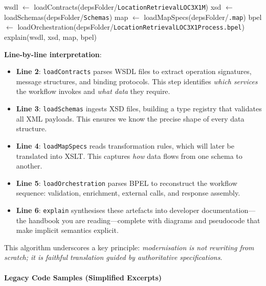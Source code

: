 \documentclass[11pt]{article}
\begin{document}
\begin{algorithm}
\caption{Understand Legacy Assets}
\label{alg:legacy-understanding}
\begin{algorithmic}[1]
  \State wsdl $\gets$ loadContracts(depsFolder/\texttt{LocationRetrievalLOC3X1M})
  \State xsd  $\gets$ loadSchemas(depsFolder/\texttt{Schemas})
  \State map  $\gets$ loadMapSpecs(depsFolder/\texttt{.map})
  \State bpel $\gets$ loadOrchestration(depsFolder/\texttt{LocationRetrievalLOC3X1Process.bpel})
  \State explain(wsdl, xsd, map, bpel) 
\EndFunction
\end{algorithmic}
\end{algorithm}

\noindent\textbf{Line-by-line interpretation}:
\begin{itemize}
  \item \textbf{Line 2}: \texttt{loadContracts} parses WSDL files to extract operation signatures, message structures, and binding protocols. This step identifies \emph{which services} the workflow invokes and \emph{what data} they require.
  \item \textbf{Line 3}: \texttt{loadSchemas} ingests XSD files, building a type registry that validates all XML payloads. This ensures we know the precise shape of every data structure.
  \item \textbf{Line 4}: \texttt{loadMapSpecs} reads transformation rules, which will later be translated into XSLT. This captures \emph{how} data flows from one schema to another.
  \item \textbf{Line 5}: \texttt{loadOrchestration} parses BPEL to reconstruct the workflow sequence: validation, enrichment, external calls, and response assembly.
  \item \textbf{Line 6}: \texttt{explain} synthesises these artefacts into developer documentation—the handbook you are reading—complete with diagrams and pseudocode that make implicit semantics explicit.
\end{itemize}

This algorithm underscores a key principle: \emph{modernisation is not rewriting from scratch; it is faithful translation guided by authoritative specifications}.

\paragraph{Legacy Code Samples (Simplified Excerpts)}
\end{document}
